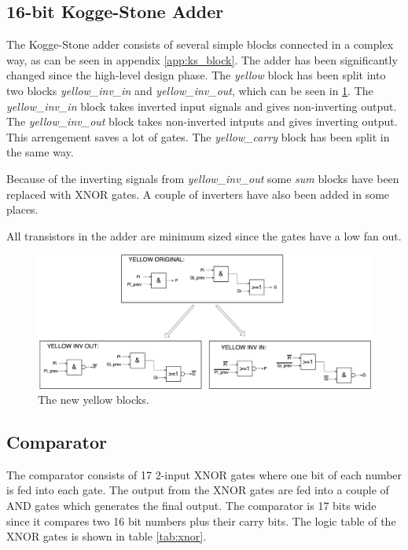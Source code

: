 \subsection{16-bit Kogge-Stone Adder}
The Kogge-Stone adder consists of several simple blocks connected in a complex way, as can be seen in appendix \ref{app:ks_block}. The adder has been significantly changed since the high-level design phase. The \textit{yellow} block has been split into two blocks \textit{yellow\_inv\_in} and \textit{yellow\_inv\_out}, which can be seen in \ref{fig:yellow_opt}. The \textit{yellow\_inv\_in} block takes inverted input signals and gives non-inverting output. The \textit{yellow\_inv\_out} block takes non-inverted intputs and gives inverting output. This arrengement saves a lot of gates. The \textit{yellow\_carry} block has been split in the same way. 

Because of the inverting signals from \textit{yellow\_inv\_out} some \textit{sum} blocks have been replaced with XNOR gates. A couple of inverters have also been added in some places.

All transistors in the adder are minimum sized since the gates have a low fan out.

\begin{figure}[H]
  \centering
  \captionsetup{justification=centering}
  \includegraphics[scale=0.2]{../figures/yellow_opt}
  \caption{The new yellow blocks.} \label{fig:yellow_opt}
\end{figure}


\subsection{Comparator}
The comparator consists of 17 2-input XNOR gates where one bit of each number is fed into each gate. The output from the XNOR gates are fed into a couple of AND gates which generates the final output. The comparator is 17 bits wide since it compares two 16 bit numbers plus their carry bits. The logic table of the XNOR gates is shown in table \ref{tab:xnor}.

